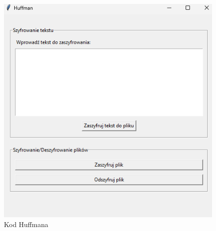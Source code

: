 \documentclass[12pt,a4paper]{article}
\begin{document}
\begin{figure}[!htb]
\begin{center}
\includegraphics[scale=0.45]{pictures/huffman.png}
\caption{Kod Huffmana}
\label{fig:Kod Huffmana}
\end{center}
\end{figure}
\end{document}
